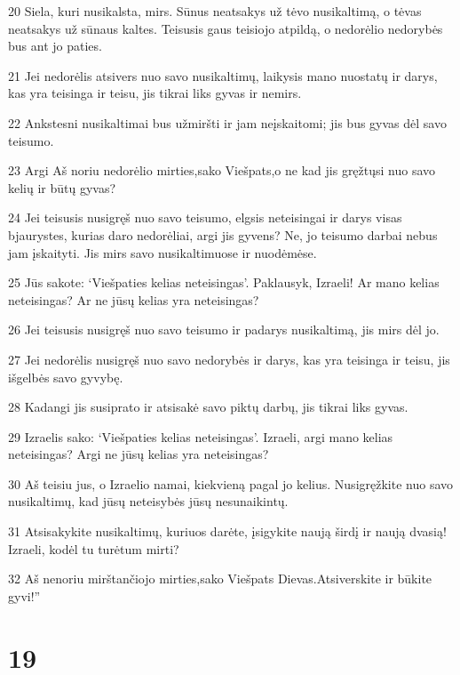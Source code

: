 \par 20 Siela, kuri nusikalsta, mirs. Sūnus neatsakys už tėvo nusikaltimą, o tėvas neatsakys už sūnaus kaltes. Teisusis gaus teisiojo atpildą, o nedorėlio nedorybės bus ant jo paties. 
\par 21 Jei nedorėlis atsivers nuo savo nusikaltimų, laikysis mano nuostatų ir darys, kas yra teisinga ir teisu, jis tikrai liks gyvas ir nemirs. 
\par 22 Ankstesni nusikaltimai bus užmiršti ir jam neįskaitomi; jis bus gyvas dėl savo teisumo. 
\par 23 Argi Aš noriu nedorėlio mirties,­sako Viešpats,­o ne kad jis gręžtųsi nuo savo kelių ir būtų gyvas? 
\par 24 Jei teisusis nusigręš nuo savo teisumo, elgsis neteisingai ir darys visas bjaurystes, kurias daro nedorėliai, argi jis gyvens? Ne, jo teisumo darbai nebus jam įskaityti. Jis mirs savo nusikaltimuose ir nuodėmėse. 
\par 25 Jūs sakote: ‘Viešpaties kelias neteisingas’. Paklausyk, Izraeli! Ar mano kelias neteisingas? Ar ne jūsų kelias yra neteisingas? 
\par 26 Jei teisusis nusigręš nuo savo teisumo ir padarys nusikaltimą, jis mirs dėl jo. 
\par 27 Jei nedorėlis nusigręš nuo savo nedorybės ir darys, kas yra teisinga ir teisu, jis išgelbės savo gyvybę. 
\par 28 Kadangi jis susiprato ir atsisakė savo piktų darbų, jis tikrai liks gyvas. 
\par 29 Izraelis sako: ‘Viešpaties kelias neteisingas’. Izraeli, argi mano kelias neteisingas? Argi ne jūsų kelias yra neteisingas? 
\par 30 Aš teisiu jus, o Izraelio namai, kiekvieną pagal jo kelius. Nusigręžkite nuo savo nusikaltimų, kad jūsų neteisybės jūsų nesunaikintų. 
\par 31 Atsisakykite nusikaltimų, kuriuos darėte, įsigykite naują širdį ir naują dvasią! Izraeli, kodėl tu turėtum mirti? 
\par 32 Aš nenoriu mirštančiojo mirties,­sako Viešpats Dievas.­Atsiverskite ir būkite gyvi!”



\chapter{19}


